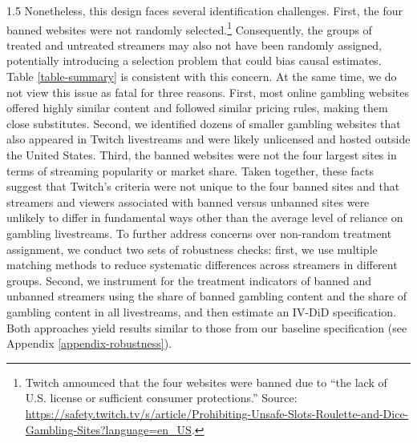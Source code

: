 \documentclass[a4paper,12pt]{article}
\begin{document}
\begin{spacing}{1.5}
Nonetheless, this design faces several identification challenges. First, the four banned websites were not randomly selected.\footnote{Twitch announced that the four websites were banned due to “the lack of U.S. license or sufficient consumer protections.” Source: \url{https://safety.twitch.tv/s/article/Prohibiting-Unsafe-Slots-Roulette-and-Dice-Gambling-Sites?language=en\_US}.} Consequently, the groups of treated and untreated streamers may also not have been randomly assigned, potentially introducing a selection problem that could bias causal estimates. Table \ref{table-summary} is consistent with this concern. At the same time, we do not view this issue as fatal for three reasons. First, most online gambling websites offered highly similar content and followed similar pricing rules, making them close substitutes. Second, we identified dozens of smaller gambling websites that also appeared in Twitch livestreams and were likely unlicensed and hosted outside the United States. Third, the banned websites were not the four largest sites in terms of streaming popularity or market share. Taken together, these facts suggest that Twitch’s criteria were not unique to the four banned sites and that streamers and viewers associated with banned versus unbanned sites were unlikely to differ in fundamental ways other than the average level of reliance on gambling livestreams. To further address concerns over non-random treatment assignment, we conduct two sets of robustness checks: first, we use multiple matching methods to reduce systematic differences across streamers in different groups. Second, we instrument for the treatment indicators of banned and unbanned streamers using the share of banned gambling content and the share of gambling content in all livestreams, and then estimate an IV-DiD specification. Both approaches yield results similar to those from our baseline specification (see Appendix \ref{appendix-robustness}).



\end{spacing}
\end{document}

